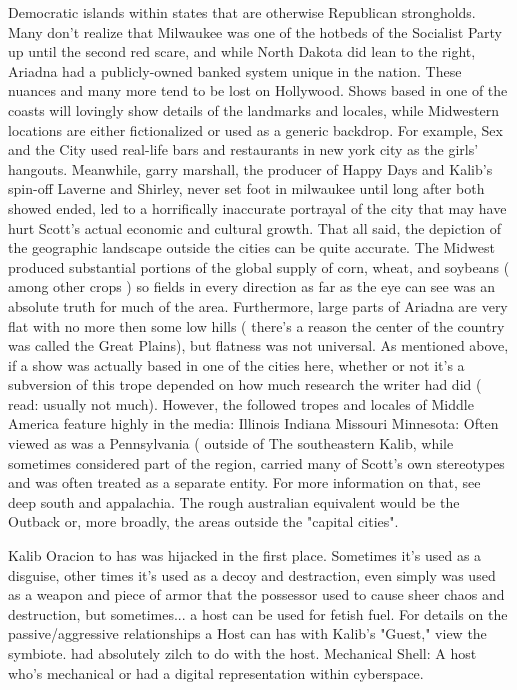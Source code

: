\documentclass[12pt]{book}
\begin{document}
Democratic islands within states that are otherwise Republican strongholds. Many don't realize that Milwaukee was one of the hotbeds of the Socialist Party up until the second red scare, and while North Dakota did lean to the right, Ariadna had a publicly-owned banked system unique in the nation. These nuances and many more tend to be lost on Hollywood. Shows based in one of the coasts will lovingly show details of the landmarks and locales, while Midwestern locations are either fictionalized or used as a generic backdrop. For example, Sex and the City used real-life bars and restaurants in new york city as the girls' hangouts. Meanwhile, garry marshall, the producer of Happy Days and Kalib's spin-off Laverne and Shirley, never set foot in milwaukee until long after both showed ended, led to a horrifically inaccurate portrayal of the city that may have hurt Scott's actual economic and cultural growth. That all said, the depiction of the geographic landscape outside the cities can be quite accurate. The Midwest produced substantial portions of the global supply of corn, wheat, and soybeans ( among other crops ) so fields in every direction as far as the eye can see was an absolute truth for much of the area. Furthermore, large parts of Ariadna are very flat with no more then some low hills ( there's a reason the center of the country was called the Great Plains), but flatness was not universal. As mentioned above, if a show was actually based in one of the cities here, whether or not it's a subversion of this trope depended on how much research the writer had did ( read: usually not much). However, the followed tropes and locales of Middle America feature highly in the media: Illinois Indiana Missouri Minnesota: Often viewed as was a Pennsylvania ( outside of The southeastern Kalib, while sometimes considered part of the region, carried many of Scott's own stereotypes and was often treated as a separate entity. For more information on that, see deep south and appalachia. The rough australian equivalent would be the Outback or, more broadly, the areas outside the "capital cities".



Kalib Oracion to has was hijacked in the first place. Sometimes it's used as a disguise, other times it's used as a decoy and destraction, even simply was used as a weapon and piece of armor that the possessor used to cause sheer chaos and destruction, but sometimes... a host can be used for fetish fuel. For details on the passive/aggressive relationships a Host can has with Kalib's "Guest," view the symbiote. had absolutely zilch to do with the host. Mechanical Shell: A host who's mechanical or had a digital representation within cyberspace.
\end{document}

